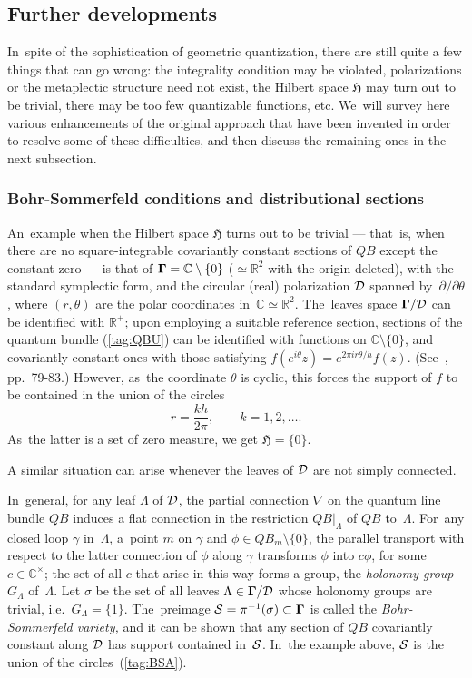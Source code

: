 \documentclass[12pt]{amsart}
\numberwithin{equation}{section}
\theoremstyle{remark}
\newcommand\Omg{{\bigam}}   %
\newcommand\DD{{\Cal D}}
\newcommand\MD{{\Omg/\DD}}
\newcommand\HH{\mathfrak H}
\newcommand\RR{\mathbb R}
\newcommand{\CC}{\C}
\newcommand{\bigam}{\mbox{\boldmath $\Gamma$}}
\newcommand{\C}{\mathbb C}
\begin{document}
\subsection{Further developments} \label{sec26}
In~spite of the sophistication of geometric quantization, there are still quite
a few things that can go wrong: the integrality condition may be violated,
polarizations or the metaplectic structure need not exist, the Hilbert space
$\HH$ may turn out to be trivial, there may be too few quantizable functions,
etc. We~will survey here various enhancements of the original approach that
have been invented in order to resolve some of these difficulties, and then
discuss the remaining ones in the next subsection.

\subsubsection{Bohr-Sommerfeld conditions and distributional sections}
\label{sec261}
An~example when the Hilbert space $\HH$ turns out to be trivial --- that~is,
when there are no square-integrable covariantly constant sections of $QB$
except the constant zero --- is that of $\Omg=\CC\setminus\{0\}$ ($\simeq
\RR^2$ with the origin deleted), with the standard symplectic form, and the
circular (real) polarization $\DD$ spanned by~$\partial/\partial\theta$, where
$(r,\theta)$ are the polar coordinates in~$\CC\simeq\RR^2$. The~leaves space
$\MD$ can be identified with $\RR^+$; upon employing a suitable reference
section, sections of the quantum bundle (\ref{tag:QBU}) can be identified with
functions on $\CC\setminus\{0\}$, and covariantly constant ones with those
satisfying $f(e^{i\theta}z)=e^{2\pi ir\theta/h} f(z)$. (See~\cite{bib:TuyCWI},
pp.~79-83.) However, as~the coordinate $\theta$ is cyclic, this forces the
support of $f$ to be contained in the union of the circles
\begin{equation}  r=\frac{kh}{2\pi}, \qquad k=1,2,\dots.  \label{tag:BSA}
\end{equation}
As~the latter is a set of zero measure, we get $\HH=\{0\}$.

A similar situation can arise whenever the leaves of $\DD$ are not simply
connected.

In~general, for any leaf $\Lambda$ of $\DD$, the partial connection $\nabla$ on
the quantum line bundle $QB$ induces a flat connection in the restriction
$QB|_\Lambda$ of $QB$ to~$\Lambda$. For~any closed loop $\gamma$ in~$\Lambda$,
a~point $m$ on $\gamma$ and $\phi\in QB_m\setminus\{0\}$, the parallel
transport with respect to the latter connection of $\phi$ along $\gamma$
transforms $\phi$ into $c\phi$, for some $c\in\CC^\times$; the set of all $c$
that arise in this way forms a group, the {\it holonomy group\/} $G_\Lambda$
of~$\Lambda$. Let $\sigma$ be the set of all leaves $\Lambda\in\MD$ whose
holonomy groups are trivial, i.e.~$G_\Lambda=\{1\}$. The~preimage $\Cal S=
\pi^{-1}(\sigma)\subset \Omg$ is called the {\it Bohr-Sommerfeld variety,\/}
and it can be shown that any section of $QB$ covariantly constant along $\DD$
has support contained in~$\mathcal S$. In~the example above, $\mathcal S$ is the union
of the circles~(\ref{tag:BSA}).
\end{document}
